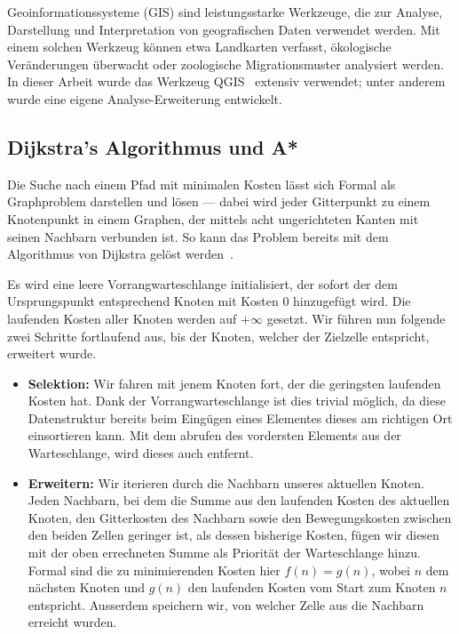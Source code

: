 Geoinformationssysteme (GIS) sind leistungsstarke Werkzeuge, die zur Analyse, Darstellung und Interpretation von geografischen Daten verwendet werden. Mit einem solchen Werkzeug können etwa Landkarten verfasst, ökologische Veränderungen überwacht oder zoologische Migrationsmuster analysiert werden.
In dieser Arbeit wurde das Werkzeug QGIS~\cite{qgis} extensiv verwendet; unter anderem wurde eine eigene Analyse-Erweiterung entwickelt.


\subsection{Dijkstra's Algorithmus und A*}

Die Suche nach einem Pfad mit minimalen Kosten lässt sich Formal als Graphproblem darstellen und lösen --- dabei wird jeder Gitterpunkt zu einem Knotenpunkt in einem Graphen, der mittels acht ungerichteten Kanten mit seinen Nachbarn verbunden ist. So kann das Problem bereits mit dem Algorithmus von Dijkstra gelöst werden~\cite{dijkstra1959note}.

Es wird eine leere Vorrangwarteschlange initialisiert, der sofort der dem Ursprungspunkt entsprechend Knoten mit Kosten 0 hinzugefügt wird. Die laufenden Kosten aller Knoten werden auf $+ \infty$ gesetzt. Wir führen nun folgende zwei Schritte fortlaufend aus, bis der Knoten, welcher der Zielzelle entspricht, erweitert wurde.
\begin{itemize}
  \item \textbf{Selektion:} Wir fahren mit jenem Knoten fort, der die geringsten laufenden Kosten hat. Dank der Vorrangwarteschlange ist dies trivial möglich, da diese Datenstruktur bereits beim Eingügen eines Elementes dieses am richtigen Ort einsortieren kann. Mit dem abrufen des vordersten Elements aus der Warteschlange, wird dieses auch entfernt.
  \item \textbf{Erweitern:} Wir iterieren durch die Nachbarn unseres aktuellen Knoten. Jeden Nachbarn, bei dem die Summe aus den laufenden Kosten des aktuellen Knoten, den Gitterkosten des Nachbarn sowie den Bewegungskosten zwischen den beiden Zellen geringer ist, als dessen bisherige Kosten, fügen wir diesen mit der oben errechneten Summe als Priorität der Warteschlange hinzu. Formal sind die zu minimierenden Kosten hier $f(n)=g(n)$, wobei $n$ dem nächsten Knoten und $g(n)$ den laufenden Kosten vom Start zum Knoten $n$ entspricht. Ausserdem speichern wir, von welcher Zelle aus die Nachbarn erreicht wurden.
\end{itemize}

